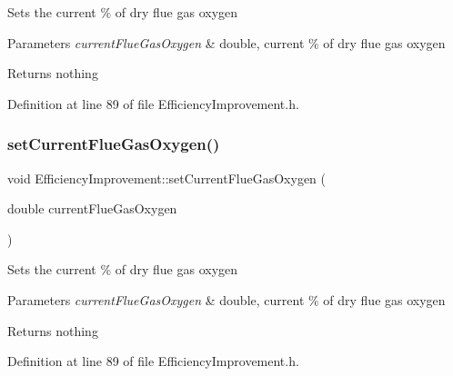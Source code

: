 Sets the current \% of dry flue gas oxygen


\begin{DoxyParams}{Parameters}
{\em current\+Flue\+Gas\+Oxygen} & double, current \% of dry flue gas oxygen\\
\hline
\end{DoxyParams}
\begin{DoxyReturn}{Returns}
nothing 
\end{DoxyReturn}


Definition at line 89 of file Efficiency\+Improvement.\+h.

\mbox{\label{class_efficiency_improvement_a038c378d51a5baf96521012a572bb106}} 
\subsubsection{\texorpdfstring{set\+Current\+Flue\+Gas\+Oxygen()}{setCurrentFlueGasOxygen()}\hspace{0.1cm}{\footnotesize\ttfamily [3/3]}}
{\footnotesize\ttfamily void Efficiency\+Improvement\+::set\+Current\+Flue\+Gas\+Oxygen (\begin{DoxyParamCaption}\item[{double}]{current\+Flue\+Gas\+Oxygen }\end{DoxyParamCaption})\hspace{0.3cm}{\ttfamily [inline]}}

Sets the current \% of dry flue gas oxygen


\begin{DoxyParams}{Parameters}
{\em current\+Flue\+Gas\+Oxygen} & double, current \% of dry flue gas oxygen\\
\hline
\end{DoxyParams}
\begin{DoxyReturn}{Returns}
nothing 
\end{DoxyReturn}


Definition at line 89 of file Efficiency\+Improvement.\+h.

\mbox{\label{class_efficiency_improvement_aef6ffeae5135982ef223ce4a5efe23d8}} 
